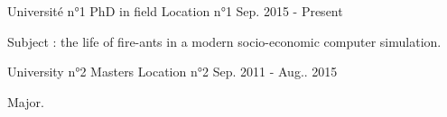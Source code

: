 


\begin{cventries}


\cventry
{Université n°1} %
{PhD in field} %
{Location n°1} %
{Sep. 2015 - Present} %
{ %
\begin{cvitems}
\item {Subject : the life of fire-ants in a modern socio-economic computer simulation. }
\end{cvitems}
}


\cventry
{University n°2} %
{Masters} %
{Location n°2} %
{Sep. 2011 - Aug.. 2015} %
{ %
\begin{cvitems}
\item {Major.}
\end{cvitems}
}


\end{cventries}